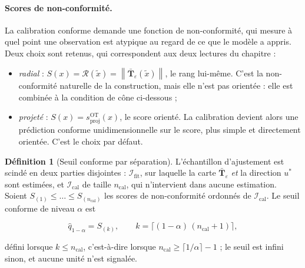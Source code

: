 \documentclass[11pt,a4paper]{article}
\theoremstyle{definition}
\newtheorem{definition}{Définition}[section]
\theoremstyle{remark}
\newcommand{\norm}[1]{\left\lVert #1 \right\rVert}
\newcommand{\Tmap}{\mathbf{T}}
\begin{document}
\bigskip

\paragraph{Scores de non-conformité.} La calibration conforme
\citep{vovk2005,lei2018,angelopoulos2023} demande une fonction de non-conformité, qui
mesure à quel point une observation est atypique au regard de ce que le modèle a appris.
Deux choix sont retenus, qui correspondent aux deux lectures du chapitre :

\medskip

\begin{itemize}[nosep,leftmargin=1.4em]
  \item \emph{radial} : $S(x) = \mathcal{R}(\tilde{x}) = \norm{\bar{\Tmap}_\varepsilon(\tilde{x})}$,
  le rang lui-même. C'est la non-conformité naturelle de la construction, mais elle n'est
  pas orientée : elle est combinée à la condition de cône ci-dessous ;
  \item \emph{projeté} : $S(x) = s^{\mathrm{OT}}_{\mathrm{proj}}(x)$, le score orienté. La
  calibration devient alors une prédiction conforme unidimensionnelle sur le score, plus
  simple et directement orientée. C'est le choix par défaut.
\end{itemize}

\bigskip

\begin{definition}[Seuil conforme par séparation]
  \label{def:conforme}
  L'échantillon d'ajustement est scindé en deux parties disjointes : $\mathcal{I}_{\mathrm{fit}}$,
  sur laquelle la carte $\bar{\Tmap}_\varepsilon$ \emph{et} la direction $u^{*}$ sont
  estimées, et $\mathcal{I}_{\mathrm{cal}}$ de taille $n_{\mathrm{cal}}$, qui n'intervient
  dans aucune estimation. Soient $S_{(1)} \le \dots \le S_{(n_{\mathrm{cal}})}$ les scores
  de non-conformité ordonnés de $\mathcal{I}_{\mathrm{cal}}$. Le seuil conforme de niveau
  $\alpha$ est

  \medskip

  \[
    \hat{q}_{1-\alpha} = S_{(k)},
    \qquad
    k = \big\lceil (1-\alpha)\,(n_{\mathrm{cal}} + 1) \big\rceil,
  \]

  \bigskip

  défini lorsque $k \le n_{\mathrm{cal}}$, c'est-à-dire lorsque
  $n_{\mathrm{cal}} \ge \lceil 1/\alpha \rceil - 1$ ; le seuil est infini sinon, et aucune
  unité n'est signalée.
\end{definition}

\bigskip
\end{document}
